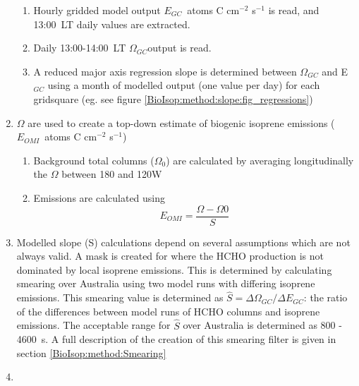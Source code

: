 \begin{enumerate}
        \begin{enumerate}
          \item 
            Hourly gridded model output $E_{GC}$~atoms C cm$^{-2}$ s$^{-1}$ is read, and 13:00~LT daily values are extracted.
          \item
            Daily 13:00-14:00~LT $\Omega_{GC}$\moleccm output is read.
          \item 
            A reduced major axis regression slope is determined between $\Omega_{GC}$ and E$_{GC}$ using a month of modelled output (one value per day) for each gridsquare (eg. see figure \ref{BioIsop:method:slope:fig_regressions})
        \end{enumerate}
      \item 
        $\Omega$ are used to create a top-down estimate of biogenic isoprene emissions ($E_{OMI}$~atoms C cm$^{-2}$ s$^{-1}$)
      \begin{enumerate}
        \item 
          Background total columns ($\Omega_{0}$) are calculated by averaging longitudinally the $\Omega$ between 180 and 120\degr W
        \item
          Emissions are calculated using 
          \begin{equation} \label{BioIsop:method:eqn_Enew}
            E_{OMI} = \frac{\Omega - \Omega{0}}{S}
          \end{equation}
      \end{enumerate}
      \item
        Modelled slope (S) calculations depend on several assumptions which are not always valid.
        A mask is created for where the HCHO production is not dominated by local isoprene emissions. 
        This is determined by calculating smearing over Australia using two model runs with differing isoprene emissions.
        This smearing value is determined as $\hat{S}=\Delta \Omega_{GC}/ \Delta E_{GC}$: the ratio of the differences between model runs of HCHO columns and isoprene emissions.
        The acceptable range for $\hat{S}$ over Australia is determined as 800 - 4600~s.
        A full description of the creation of this smearing filter is given in section \ref{BioIsop:method:Smearing}
      \item 

\end{enumerate}
